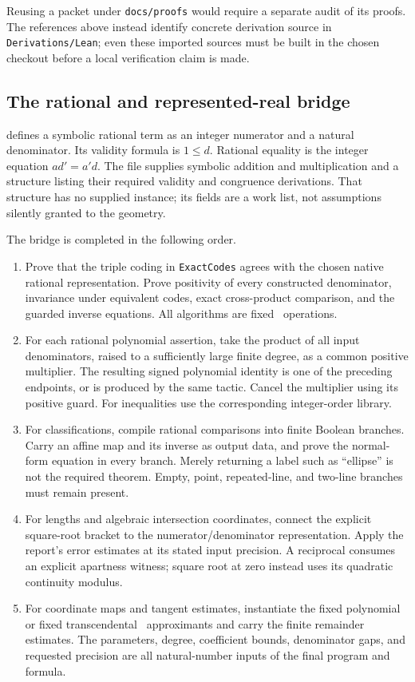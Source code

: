Reusing a packet under \texttt{docs/proofs} would require a separate audit of its
proofs.  The references above instead identify concrete derivation source in
\texttt{Derivations/Lean}; even these imported sources must be built in the
chosen checkout before a local verification claim is made.

\subsection{The rational and represented-real bridge}

 defines a symbolic rational term as an integer
numerator and a natural denominator.  Its validity formula is $1\le d$.
Rational equality is the integer equation $ad'=a'd$.  The file supplies
symbolic addition and multiplication and a structure listing their required
validity and congruence derivations.  That structure has no supplied instance;
its fields are a work list, not assumptions silently granted to the geometry.

The bridge is completed in the following order.

\begin{enumerate}
\item Prove that the triple coding in \texttt{ExactCodes} agrees with the
chosen native rational representation.  Prove positivity of every constructed
denominator, invariance under equivalent codes, exact cross-product comparison,
and the guarded inverse equations.  All algorithms are fixed \PR\ operations.
\item For each rational polynomial assertion, take the product of all input
denominators, raised to a sufficiently large finite degree, as a common positive
multiplier.  The resulting signed polynomial identity is one of the preceding
endpoints, or is produced by the same tactic.  Cancel the multiplier using its
positive guard.  For inequalities use the corresponding integer-order library.
\item For classifications, compile rational comparisons into finite Boolean
branches.  Carry an affine map and its inverse as output data, and prove the
normal-form equation in every branch.  Merely returning a label such as
``ellipse'' is not the required theorem.  Empty, point, repeated-line, and
two-line branches must remain present.
\item For lengths and algebraic intersection coordinates, connect the explicit
square-root bracket to the numerator/denominator representation.  Apply the
report's error estimates at its stated input precision.  A reciprocal consumes
an explicit apartness witness; square root at zero instead uses its quadratic
continuity modulus.
\item For coordinate maps and tangent estimates, instantiate the fixed
polynomial or fixed transcendental \PR\ approximants and carry the finite
remainder estimates.  The parameters, degree, coefficient bounds, denominator
gaps, and requested precision are all natural-number inputs of the final
program and formula.
\end{enumerate}

